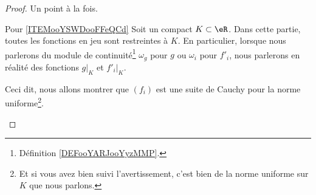 \begin{proof}
    Un point à la fois.
    \begin{subproof}
        \item[Pour \ref{ITEMooYSWDooFFeQCd}]
            Soit un compact \( K\subset \eR\). Dans cette partie, toutes les fonctions en jeu sont restreintes à \( K\). En particulier, lorsque nous parlerons du module de continuité\footnote{Définition \ref{DEFooYARJooYyzMMP}.} \( \omega_g\) pour \( g\) ou \( \omega_i\) pour \( f'_i\), nous parlerons en réalité des fonctions \( g|_K\) et \( f'_i|_K\).

            Ceci dit, nous allons montrer que \( (f_i)\) est une suite de Cauchy pour la norme uniforme\footnote{Et si vous avez bien suivi l'avertissement, c'est bien de la norme uniforme sur \( K\) que nous parlons.}.
  

\end{subproof}
\end{proof}
